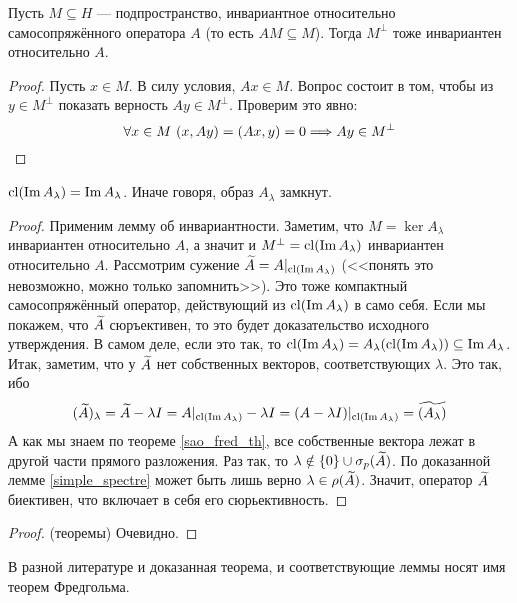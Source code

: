 \begin{lemma}
	Пусть $M \subseteq H$ --- подпространство, инвариантное относительно самосопряжённого оператора $A$ (то есть $AM \subseteq M$). Тогда $M^\bot$ тоже инвариантен относительно $A$.
\end{lemma}

\begin{proof}
	Пусть $x \in M$. В силу условия, $Ax \in M$. Вопрос состоит в том, чтобы из  $y \in M^\bot$ показать верность $Ay \in M^\bot$. Проверим это явно:
	\[
		\forall x \in M\ (x, Ay) = (Ax, y) = 0 \Longrightarrow Ay \in M^\bot
	\]
\end{proof}

\begin{lemma}
	$\operatorname{cl} (\operatorname{Im} A_\lambda) = \operatorname{Im} A_\lambda$. Иначе говоря, образ $A_\lambda$ замкнут.
\end{lemma}

\begin{proof}
	Применим лемму об инвариантности. Заметим, что $M = \ker A_\lambda$ инвариантен относительно $A$, а значит и $M^\bot = \operatorname{cl}(\operatorname{Im} A_\lambda)$ инвариантен относительно $A$. Рассмотрим сужение $\widetilde{A} = A|_{\operatorname{cl}(\operatorname{Im} A_\lambda)}$ (<<понять это невозможно, можно только запомнить>>). Это тоже компактный самосопряжённый оператор, действующий из $\operatorname{cl}(\operatorname{Im} A_\lambda)$ в само себя. Если мы покажем, что $\widetilde{A}$ сюръективен, то это будет доказательство исходного утверждения. В самом деле, если это так, то $\operatorname{cl}(\operatorname{Im} A_\lambda) = A_\lambda(\operatorname{cl}(\operatorname{Im} A_\lambda)) \subseteq \operatorname{Im} A_\lambda$. Итак, заметим, что у $\widetilde{A}$ нет собственных векторов, соответствующих $\lambda$. Это так, ибо
	\[
		(\widetilde{A})_\lambda = \widetilde{A} - \lambda I = A|_{\operatorname{cl}(\operatorname{Im} A_\lambda)} - \lambda I = (A - \lambda I)|_{\operatorname{cl}(\operatorname{Im} A_\lambda)} = \widetilde{(A_\lambda)}
	\]
	А как мы знаем по теореме \ref{sao_fred_th}, все собственные вектора лежат в другой части прямого разложения. Раз так, то $\lambda \notin \{0\} \cup \sigma_p(\widetilde{A})$. По доказанной лемме \ref{simple_spectre} может быть лишь верно $\lambda \in \rho(\widetilde{A})$. Значит, оператор $\widetilde{A}$ биективен, что включает в себя его сюрьективность.
\end{proof}

\begin{proof} (теоремы)
	Очевидно.
\end{proof}

\begin{note}
	В разной литературе и доказанная теорема, и соответствующие леммы носят имя теорем Фредгольма.
\end{note}

